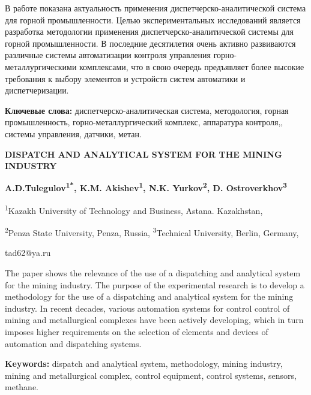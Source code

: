 \hspace{1.5em} В работе показана актуальность применения диспетчерско-аналитической
система для горной промышленности. Целью экспериментальных исследований
является разработка методологии применения диспетчерско-аналитической
системы для горной промышленности. В последние десятилетия очень активно
развиваются различные системы автоматизации контроля управления
горно-металлургическими комплексами, что в свою очередь предъявляет
более высокие требования к выбору элементов и устройств систем
автоматики и диспетчеризации.

\hspace{1.5em} {\bfseries Ключевые слова:} диспетчерско-аналитическая система,
методология, горная промышленность, горно-металлургический комплекс,
аппаратура контроля,, системы управления, датчики, метан.

\begin{center}
{\large\bfseries DISPATCH AND ANALYTICAL SYSTEM FOR THE MINING INDUSTRY}

\vspace{1em}

{\bfseries A.D.Tulegulov\textsuperscript{1*}, K.M.
Akishev\textsuperscript{1}, N.K. Yurkov\textsuperscript{2}, D.
Ostroverkhov\textsuperscript{3}}

\textsuperscript{1}Kazakh University of Technology and Business, Astana.
Kazakhstan,

\textsuperscript{2}Penza State University, Penza, Russia,
\textsuperscript{3}Technical University, Berlin, Germany,

tad62@ya.ru
\end{center}

\hspace{1.5em} The paper shows the relevance of the use of a dispatching and analytical
system for the mining industry. The purpose of the experimental research
is to develop a methodology for the use of a dispatching and analytical
system for the mining industry. In recent decades, various automation
systems for control control of mining and metallurgical complexes have
been actively developing, which in turn imposes higher requirements on
the selection of elements and devices of automation and dispatching
systems.

\hspace{1.5em} {\bfseries Keywords:} dispatch and analytical system, methodology, mining
industry, mining and metallurgical complex, control equipment, control
systems, sensors, methane.

